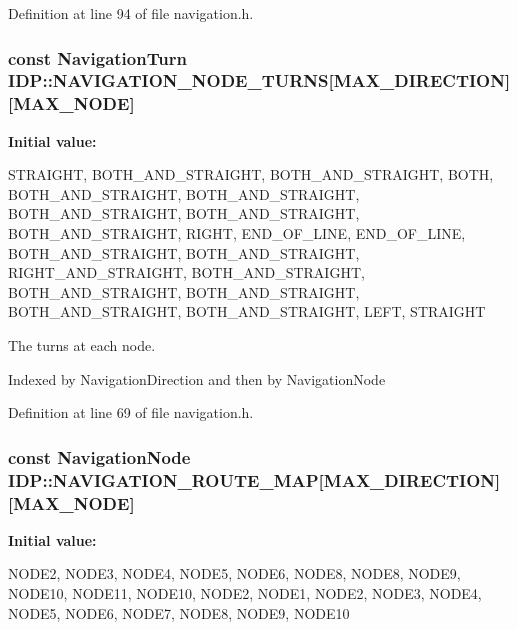 Definition at line 94 of file navigation.h.

\hypertarget{namespaceIDP_aa117cb76acf18e6af22830d5f2468ff4}{
\subsubsection[{NAVIGATION\_\-NODE\_\-TURNS}]{\setlength{\rightskip}{0pt plus 5cm}const {\bf NavigationTurn} {\bf IDP::NAVIGATION\_\-NODE\_\-TURNS}\mbox{[}MAX\_\-DIRECTION\mbox{]}\mbox{[}MAX\_\-NODE\mbox{]}}}
\label{namespaceIDP_aa117cb76acf18e6af22830d5f2468ff4}
{\bfseries Initial value:}
\begin{DoxyCode}
 {
        {STRAIGHT, BOTH_AND_STRAIGHT, BOTH_AND_STRAIGHT, BOTH,
            BOTH_AND_STRAIGHT, BOTH_AND_STRAIGHT, BOTH_AND_STRAIGHT,
            BOTH_AND_STRAIGHT, BOTH_AND_STRAIGHT, RIGHT, END_OF_LINE},
        {END_OF_LINE, BOTH_AND_STRAIGHT, BOTH_AND_STRAIGHT, RIGHT_AND_STRAIGHT,
            BOTH_AND_STRAIGHT, BOTH_AND_STRAIGHT, BOTH_AND_STRAIGHT,
            BOTH_AND_STRAIGHT, BOTH_AND_STRAIGHT, LEFT, STRAIGHT}
    }
\end{DoxyCode}


The turns at each node. 

Indexed by NavigationDirection and then by NavigationNode 

Definition at line 69 of file navigation.h.

\hypertarget{namespaceIDP_a33ba7fcc78e0c8e5477d2ed6ac18e48f}{
\subsubsection[{NAVIGATION\_\-ROUTE\_\-MAP}]{\setlength{\rightskip}{0pt plus 5cm}const {\bf NavigationNode} {\bf IDP::NAVIGATION\_\-ROUTE\_\-MAP}\mbox{[}MAX\_\-DIRECTION\mbox{]}\mbox{[}MAX\_\-NODE\mbox{]}}}
\label{namespaceIDP_a33ba7fcc78e0c8e5477d2ed6ac18e48f}
{\bfseries Initial value:}
\begin{DoxyCode}
 {
        {NODE2, NODE3, NODE4, NODE5, NODE6, NODE8, NODE8, NODE9, NODE10,
            NODE11, NODE10},
        {NODE2, NODE1, NODE2, NODE3, NODE4, NODE5, NODE6, NODE7, NODE8,
            NODE9, NODE10}
    }
\end{DoxyCode}



